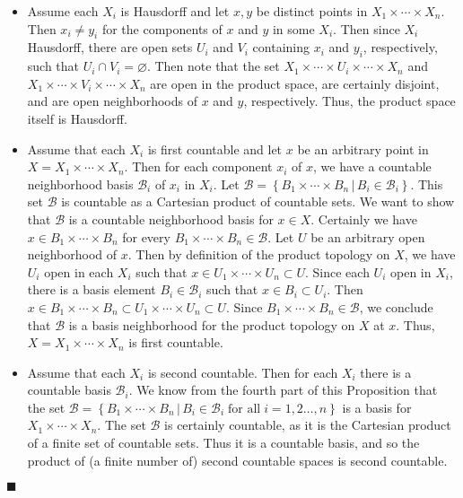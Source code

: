 \documentclass[12pt]{article}
\renewcommand{\qed}{\hfill$\blacksquare$}
\renewenvironment{proof}{\begin{addmargin}[1em]{0em}\begin{newproof}}{\end{newproof}\end{addmargin}\qed}
\begin{document}
\begin{proof}
\begin{itemize}
	\item Assume each $X_i$ is Hausdorff and let $x,y$ be distinct points in $X_1 \times \cdots \times X_n$. Then $x_i \neq y_i$ for the components of $x$ and $y$ in some $X_i$. Then since $X_i$ Hausdorff, there are open sets $U_i$ and $V_i$ containing $x_i$ and $y_i$, respectively, such that $U_i \cap V_i = \varnothing$. Then note that the set $X_1 \times \cdots \times U_i \times \cdots \times X_n$ and $X_1 \times \cdots \times V_i \times \cdots \times X_n$ are open in the product space, are certainly disjoint, and are open neighborhoods of $x$ and $y$, respectively. Thus, the  product space itself is Hausdorff.
	\item Assume that each $X_i$ is first countable and let $x$ be an arbitrary point in $X=X_1\times \cdots \times X_n$. Then for each component $x_i$ of $x$, we have a countable neighborhood basis $\mathcal{B}_i$ of $x_i$ in $X_i$. Let $\mathcal{B} = \left\{ B_1\times \cdots \times B_n \, | \, B_i \in \mathcal{B}_i \right\}$. This set $\mathcal{B}$ is countable as a Cartesian product of countable sets. We want to show that $\mathcal{B}$ is a countable neighborhood basis for $x \in X$. Certainly we have $x \in B_1 \times \cdots \times B_n$ for every $B_1 \times \cdots \times B_n \in \mathcal{B}$. Let $U$ be an arbitrary open neighborhood of $x$. Then by definition of the product topology on $X$, we have $U_i $ open in each $X_i$ such that $x \in U_1 \times \cdots \times U_n \subset U$. Since each $U_i$ open in $X_i$, there is a basis element $B_i \in \mathcal{B}_i$ such that $x \in B_i \subset U_i$. Then $x \in B_1 \times \cdots \times B_n \subset U_1 \times \cdots \times U_n \subset U$. Since $B_1 \times \cdots \times B_n \in \mathcal{B}$, we conclude that $\mathcal{B}$ is a basis neighborhood for the product topology on $X$ at $x$. Thus, $X=X_1\times\cdots \times X_n$ is first countable.
	\item Assume that each $X_i$ is second countable. Then for each $X_i$ there is a countable basis $\mathcal{B}_i$. We know from the fourth part of this Proposition that the set $\mathcal{B}=\left\{ B_1 \times \cdots \times B_n \, | \, B_i \in \mathcal{B}_i \; \text{for all}\; i =1,2\ldots,n \right\}$ is a basis for $X_1 \times \cdots \times X_n$. The set $\mathcal{B}$ is certainly countable, as it is the Cartesian product of a finite set of countable sets. Thus it is a countable basis, and so the product of (a finite number of) second countable spaces is second countable.
\end{itemize}
\end{proof}
\end{document}

